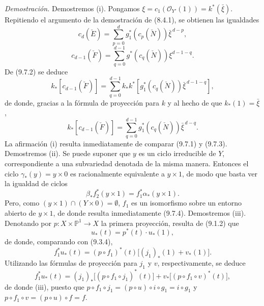 \emph{Demostración.} Demostremos (i). Pongamos $\xi=c_1(\mathcal O_{Y'}(1))=k^*(\bar\xi)$. Repitiendo el argumento de la demostración de (8.4.1), se obtienen las igualdades
\[
c_d(\check E)=\sum_{p=0}^d g_1^*(c_p(\check N))\bar\xi^{\,d-p},
\tag{9.7.1}
\]
\[
c_{d-1}(\check F)=\sum_{q=0}^{d-1}g^*(c_q(\check N))\xi^{d-1-q}.
\tag{9.7.2}
\]
De (9.7.2) se deduce
\[
k_*[c_{d-1}(\check F)]
=\sum_{q=0}^{d-1}k_*k^*[g_1^*(c_q(\check N))\bar\xi^{\,d-1-q}],
\]
de donde, gracias a la fórmula de proyección para $k$ y al hecho de que $k_*(1)=\bar\xi$,
\[
k_*[c_{d-1}(\check F)]=\sum_{q=0}^{d-1}g_1^*(c_q(\check N))\bar\xi^{\,d-q}.
\tag{9.7.3}
\]
La afirmación (i) resulta inmediatamente de comparar (9.7.1) y (9.7.3). Demostremos (ii). Se puede suponer que $y$ es un ciclo irreducible de $Y$, correspondiente a una subvariedad denotada de la misma manera. Entonces el ciclo $\gamma_*(y)=y\times0$ es racionalmente equivalente a $y\times1$, de modo que basta ver la igualdad de ciclos
\[
\beta_*f_2^*(y\times1)=f_1^*\alpha_*(y\times1).
\tag{9.7.4}
\]
Pero, como $(y\times1)\cap(Y\times0)=\emptyset$, $f_1$ es un isomorfismo sobre un entorno abierto de $y\times1$, de donde resulta inmediatamente (9.7.4). Demostremos (iii). Denotando por $p:X\times\mathbb P^1\to X$ la primera proyección, resulta de (9.1.2) que
\[
u_*(t)=p^*(t)\cdot u_*(1),
\tag{9.7.5}
\]
de donde, comparando con (9.3.4),
\[
f_1^*u_*(t)=(p\circ f_1)^*(t)\bigl[(j_1)_*(1)+v_*(1)\bigr].
\tag{9.7.6}
\]
Utilizando las fórmulas de proyección para $j_1$ y $v$, respectivamente, se deduce
\[
f_1^*u_*(t)=(j_1)_*\bigl[(p\circ f_1\circ j_1)^*(t)\bigr]+v_*\bigl[(p\circ f_1\circ v)^*(t)\bigr],
\tag{9.7.7}
\]
de donde (iii), puesto que $p\circ f_1\circ j_1=(p\circ u)\circ i\circ g_1=i\circ g_1$ y $p\circ f_1\circ v=(p\circ u)\circ f=f$.
